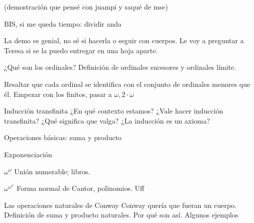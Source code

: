 \documentclass[10pt,spanish]{beamer}
\begin{document}
\begin{frame}
(demostración que pensé con juampi y saqué de mse)
\end{frame}

\begin{frame}{BIS, si me queda tiempo: dividir anda}

La demo es genial, no sé si hacerla o seguir con cuerpos. Le voy a preguntar a Teresa si se la puedo entregar en una hoja aparte.

\end{frame}














\begin{frame}{¿Qué son los ordinales?}
	Definición de ordinales sucesores y ordinales límite.
	
	Resaltar que cada ordinal se identifica con el conjunto de ordinales menores que él. Empezar con los finitos, pasar a $\omega, 2\cdot \omega$
\end{frame}

\begin{frame}{Inducción transfinita}
	¿En qué contexto estamos? ¿Vale hacer inducción transfinita? ¿Qué significa que valga? ¿La inducción es un axioma?
\end{frame}

\begin{frame}{Operaciones básicas: suma y producto}

\end{frame}

\begin{frame}{Exponenciación}


\end{frame}

\begin{frame}{$\omega^\omega$}
	Unión numerable; libros.
\end{frame}

\begin{frame}{$\omega^{\omega^\omega}$}
	Forma normal de Cantor, polinomios. Uff
\end{frame}

\begin{frame}{Las operaciones naturales de Conway}
	Conway quería que fueran un cuerpo. Definición de suma y producto naturales. Por qué son así. Algunos ejemplos
\end{frame}
\end{document}
